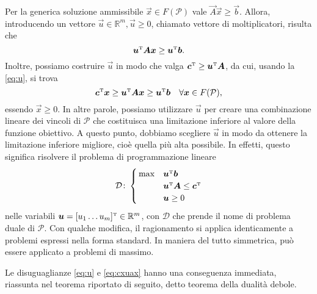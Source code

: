 Per la generica soluzione ammissibile \( \vec{x} \in F(\mathcal{P}) \) vale \( \vec{A}\vec{x} \geq \vec{b} \). Allora,
introducendo un vettore \( \vec{u} \in \mathbb{R}^m, \vec{u} \geq 0 \), chiamato vettore di moltiplicatori, risulta che
\begin{equation}\label{eq:u}
    \bm{u}^{\scriptscriptstyle\mathrm{T}}\bm{A}\bm{x} \geq \bm{u}^{\scriptscriptstyle\mathrm{T}}\bm{b}.
\end{equation}
Inoltre, possiamo costruire \( \vec{u} \) in modo che valga \( \bm{c}^{\scriptscriptstyle\mathrm{T}} \geq \bm{u}^{\scriptscriptstyle\mathrm{T}} \bm{A} \), da cui,
usando la \eqref{eq:u}, si trova
\begin{equation}\label{eq:cxuax}
    \bm{c}^{\scriptscriptstyle\mathrm{T}}\bm{x} \geq \bm{u}^{\scriptscriptstyle\mathrm{T}}\bm{A}\bm{x} \geq \bm{u}^{\scriptscriptstyle\mathrm{T}}\bm{b} \quad \forall \bm{x} \in
    F(\mathcal{P}),
\end{equation}
essendo \( \vec{x} \geq 0 \). In altre parole, possiamo utilizzare \( \vec{u} \) per creare una combinazione lineare dei
vincoli di \( \mathcal{P} \) che costituisca una limitazione inferiore al valore della funzione obiettivo. A questo
punto, dobbiamo scegliere \( \vec{u} \) in modo da ottenere la limitazione inferiore migliore, cioè quella più alta
possibile. In effetti, questo significa risolvere il problema di programmazione lineare
\begin{equation}\label{eq:dual}
    \mathcal{D}\colon
    \begin{cases}
        \,\max & \bm{u}^{\scriptscriptstyle\mathrm{T}} \bm{b} \\
               & \bm{u}^{\scriptscriptstyle\mathrm{T}}\bm{A} \le \bm{c}^{\scriptscriptstyle\mathrm{T}} \\
             & \bm{u} \ge 0
    \end{cases}\\[7pt]
\end{equation}
nelle variabili \( \bm{u} = [u_1 \ldots u_m]^{\scriptscriptstyle\mathrm{T}} \in \mathbb{R}^m \), con \( \mathcal{D} \) che prende il nome di
problema duale di \( \mathcal{P} \).
Con qualche modifica, il ragionamento si applica identicamente a problemi espressi nella forma standard. In maniera del
tutto simmetrica, può essere applicato a problemi di massimo.

Le disuguaglianze \eqref{eq:u} e \eqref{eq:cxuax} hanno una conseguenza immediata, riassunta nel teorema riportato di
seguito, detto teorema della dualità debole.


